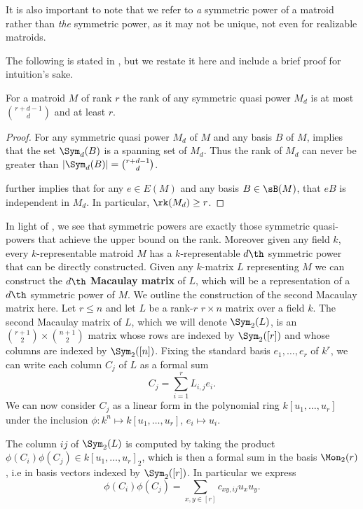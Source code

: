 It is also important to note that we refer to \textit{a} symmetric power of a matroid rather than \textit{the} symmetric power, as it may not be unique, not even for realizable matroids.

The following is stated in \cite{MGlueing}, but we restate it here and include a brief proof for intuition's sake.

\begin{proposition}\cite{MGlueing}\label{prop:masonFullRank}
    For a matroid $M$ of rank $r$ the rank of any symmetric quasi power $M_d$ is at most $\binom{r+d-1}{d}$ and at least $r$.
\end{proposition}

\begin{proof}
For any symmetric quasi power $M_d$ of $M$ and any basis $B$ of $M$,  implies that the set $\Sym_d(B)$ is a spanning set of $M_d$. Thus the rank of $M_d$ can never be greater than $|\Sym_d(B)|=\binom{r+d-1}{d}$.

 further implies that for any $e\in E(M)$ and any basis $B\in \sB(M)$, that $eB$ is independent in $M_d$. In particular, $\rk(M_d)\geq r$.
\end{proof}
 In light of , we see that symmetric powers are exactly those symmetric quasi-powers that achieve the upper bound on the rank. Moreover given any field $k$, every $k$-representable matroid $M$ has a $k$-representable $d\th$ symmetric power that can be directly constructed. Given any $k$-matrix $L$ representing $M$ we can construct the $d\th$ \textbf{Macaulay matrix} of $L$, which will be a representation of a $d\th$ symmetric power of $M$. We outline the construction of the second Macaulay matrix here. Let $r\leq n$ and let $L$ be a rank-$r$ $r\times n$ matrix over a field $k$. The second Macaulay matrix of $L$, which we will denote $\Sym_2(L)$, is an $\binom{r+1}{2}\times \binom{n+1}{2}$ matrix whose rows are indexed by $\Sym_2([r])$ and whose columns are indexed by $\Sym_2([n])$. Fixing the standard basis $e_1,\dots,e_r$ of $k^r$, we can write each column $C_j$ of $L$ as a formal sum 
$$C_j = \sum_{i=1}^r L_{i,j}e_i.$$
We can now consider $C_j$ as a linear form in the polynomial ring $k[u_1,\dots,u_r]$ under the inclusion $\phi:k^n\mapsto k[u_1,\dots,u_r]$, $e_i\mapsto u_i$.

The column $ij$ of $\Sym_2(L)$ is computed by taking the product $\phi(C_i)\phi(C_j)\in k[u_1,\dots,u_r]_2$, which is then a formal sum in the basis $\Mon_2(r)$, i.e in basis vectors indexed by $\Sym_2([r])$. In particular we express 
$$\phi(C_i)\phi(C_j)=\sum_{x,y\in[r]} c_{xy,ij}u_xu_y.$$

